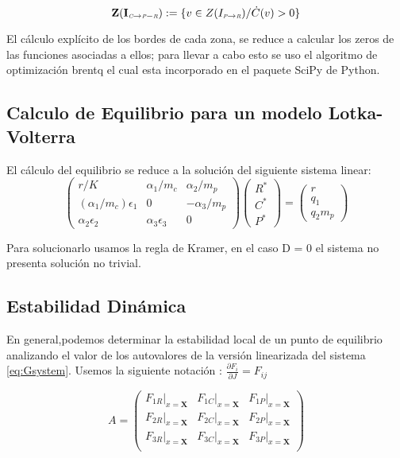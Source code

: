 \begin{equation}
\mathbf{Z(I_{\textit{\tiny C} \to \textit{\tiny P}-\textit{\tiny R}})} := \{v \in Z(I_{\textit{\tiny P} \to \textit{\tiny R}}) / \dot{C}(v) > 0\}
\end{equation}


El c\'alculo expl\'icito de los bordes de cada zona, se reduce a calcular los zeros de las funciones asociadas a ellos; para llevar a cabo esto se uso el algoritmo de optimizaci\'on brentq el cual esta incorporado en el paquete SciPy de Python.



\subsection{Calculo de Equilibrio para un modelo Lotka-Volterra}\label{subsec:equil}
El c\'alculo del equilibrio se reduce a la soluci\'on del siguiente sistema linear:
\begin{equation}
\begin{pmatrix}
r/K & \alpha_1/m_c & \alpha_2/m_p \\
(\alpha_1/m_c)\epsilon_1& 0 & -\alpha_3/m_p \\
\alpha_2 \epsilon_2 & \alpha_3 \epsilon_3 & 0
\end{pmatrix}
\begin{pmatrix}
R^* \\
C^* \\
P^* 
\end{pmatrix}
=
\begin{pmatrix}
r \\
q_1 \\
q_2 m_p
\end{pmatrix}
\end{equation}

Para solucionarlo usamos la regla de Kramer, en el caso D = 0 el sistema no presenta soluci\'on no trivial.

\subsection{Estabilidad Din\'amica}\label{subsec:stab}
En general,podemos determinar la estabilidad local de un punto de equilibrio analizando el valor de los autovalores de la versi\'on linearizada del sistema \eqref{eq:Gsystem}. \citep{yodzis1989introduction}
Usemos la siguiente notaci\'on : $ \frac{\partial F_i}{\partial J} = F_{ij} $

\begin{equation} \label{eq:linver}
A = \begin{pmatrix}
\left. F_{1R} \right|_{x=\mathbf{X}}& \left.F_{1C}\right|_{x=\mathbf{X}}&\left.F_{1P}\right|_{x=\mathbf{X}}\\
\left. F_{2R}\right|_{x=\mathbf{X}}& \left.F_{2C}\right|_{x=\mathbf{X}}&\left.F_{2P}\right|_{x=\mathbf{X}}\\
\left. F_{3R}\right|_{x=\mathbf{X}}& \left.F_{3C}\right|_{x=\mathbf{X}}&\left.F_{3P}\right|_{x=\mathbf{X}}\\
\end{pmatrix}
\end{equation}

